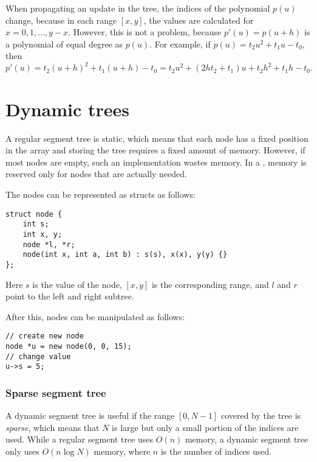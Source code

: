 When propagating an update in the tree,
the indices of the polynomial $p(u)$ change,
because in each range $[x,y]$,
the values are
calculated for $x=0,1,\ldots,y-x$.
However, this is not a problem, because
$p'(u)=p(u+h)$ is a polynomial
of equal degree as $p(u)$.
For example, if $p(u)=t_2 u^2+t_1 u-t_0$, then
\[p'(u)=t_2(u+h)^2+t_1(u+h)-t_0=t_2 u^2 + (2ht_2+t_1)u+t_2h^2+t_1h-t_0.\]

\section{Dynamic trees}


A regular segment tree is static,
which means that each node has a fixed position
in the array and storing the tree requires
a fixed amount of memory.
However, if most nodes are empty, such an
implementation wastes memory.
In a ,
memory is reserved only for nodes that
are actually needed.

The nodes can be represented as structs as follows:

\begin{lstlisting}
struct node {
    int s;
    int x, y;
    node *l, *r;
    node(int x, int a, int b) : s(s), x(x), y(y) {}
};
\end{lstlisting}
Here $s$ is the value of the node,
$[x,y]$ is the corresponding range,
and $l$ and $r$ point to the left
and right subtree.

After this, nodes can be manipulated as follows:

\begin{lstlisting}
// create new node
node *u = new node(0, 0, 15);
// change value
u->s = 5;
\end{lstlisting}

\subsubsection{Sparse segment tree}


A dynamic segment tree is useful if
the range $[0,N-1]$ covered by the tree is \emph{sparse},
which means that $N$ is large but only a
small portion of the indices are used.
While a regular segment tree uses $O(n)$ memory,
a dynamic segment tree only uses $O(n \log N)$ memory,
where $n$ is the number of indices used.

